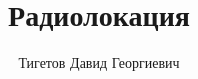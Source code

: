 \documentclass[a4paper,12pt]{article}
\begin{document}
\title{Радиолокация}
\author{Тигетов Давид Георгиевич}
\maketitle


\end{document}
